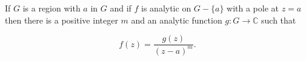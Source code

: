 If $G$ is a region with $a$ in $G$ and if $f$ is analytic on $G - \{a\}$ with a pole at $z = a$ then there is a positive integer $m$ and an analytic function $g: G \to \mathbb{C}$ such that

$$f(z) = \frac{g(z)}{(z-a)^{m}}.$$